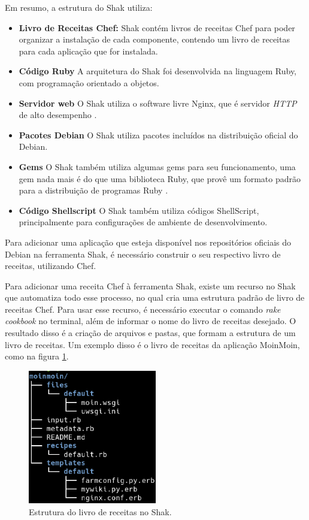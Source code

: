 Em resumo, a estrutura do Shak utiliza:

\begin{itemize}
  \item  \textbf{Livro de Receitas Chef:} Shak contém livros de receitas Chef
  para poder organizar a instalação de cada componente, contendo um livro
  de receitas para cada aplicação que for instalada.
  \item  \textbf{Código Ruby} A arquitetura do Shak foi desenvolvida na linguagem
  Ruby, com programação orientado a objetos.
  \item  \textbf{Servidor web} O Shak utiliza o software livre Nginx, que é
  servidor \textit{HTTP} de alto desempenho \cite{nginx}.
  \item  \textbf{Pacotes Debian} O Shak utiliza pacotes incluídos na distribuição
  oficial do Debian.
  \item  \textbf{Gems} O Shak também utiliza algumas gems para seu funcionamento,
  uma gem nada mais é do que uma biblioteca Ruby, que provê um formato padrão para
  a distribuição de programas Ruby \cite{gem}.
  \item  \textbf{Código Shellscript} O Shak também utiliza códigos ShellScript,
  principalmente para configurações de ambiente de desenvolvimento. 
\end{itemize}

Para adicionar uma aplicação que esteja disponível nos repositórios oficiais
do Debian na ferramenta Shak, é necessário construir o seu respectivo 
livro de receitas, utilizando Chef. 

Para adicionar uma receita Chef à ferramenta Shak, existe um recurso no Shak que
automatiza todo esse processo, no qual cria uma estrutura padrão de livro de receitas
Chef. Para usar esse recurso, é necessário executar o comando \textit{rake cookbook}
no terminal, além de informar o nome do livro de receitas desejado. O resultado
disso é a criação de arquivos e pastas, que formam a estrutura de um livro de receitas. Um
exemplo disso é o livro de receitas da aplicação MoinMoin, como na figura \ref{fig:x}. 

\begin{figure}[H]
  \centering
  \includegraphics[width=0.5\textwidth]
      {figuras/cookbook}
      \caption{Estrutura do livro de receitas no Shak.}
  \label{fig:x}
\end{figure}

